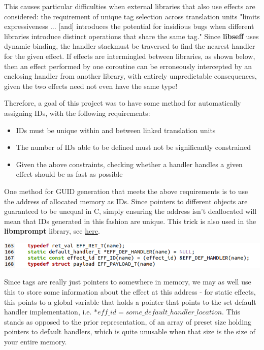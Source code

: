 \documentclass[logo,bsc,singlespacing,parskip,online]{infthesis}
\begin{document}
This causes particular difficulties when external libraries that also use effects are considered:  the requirement of unique tag selection across translation units "limits expressiveness ... [and] introduces the potential for insidious bugs when different libraries introduce distinct operations that share the same tag."\cite{libseff_paper} Since \textbf{libseff} uses dynamic binding\cite{libseff_paper}, the handler stack\todo* must be traversed to find the nearest handler for the given effect. If effects are intermingled between libraries, as shown below, then an effect performed by one coroutine can be erroneously intercepted by an enclosing handler from another library, with entirely unpredictable consequences, given the two effects need not even have the same type!

Therefore, a goal of this project was to have some method for automatically assigning IDs, with the following requirements:

\begin{itemize}
\item IDs must be unique within and between linked translation units
\item The number of IDs able to be defined must not be significantly constrained
\item Given the above constraints, checking whether a handler handles a given effect should be as fast as possible
\end{itemize}

One method for GUID generation that meets the above requirements is to use the address of allocated memory as IDs. Since pointers to different objects are guaranteed to be unequal in C\textcite[see § 6.5.10 para 7]{iso9899-2024}, simply ensuring the address isn't deallocated will mean that IDs generated in this fashion are unique. This trick is also used in the \textbf{libmprompt} library, see \href{https://github.com/koka-lang/libmprompt/blob/main/include/mpeff.h#L155}{here}.\cite{libmprompt}

\includegraphics[scale=0.7]{ID_def_code.png}

Since tags are really just pointers to somewhere in memory, we may as well use this to store some information about the effect at this address - for static effects, this points to a global variable that holds a pointer that points to the set default handler implementation, i.e.  $*eff\_id = some\_default\_handler\_location$. This stands as opposed to the prior representation, of an array of preset size holding pointers to default handlers, which is quite unusable when that size is the size of your entire memory.
\end{document}
